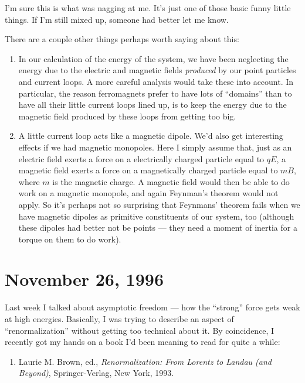 \documentclass{article}
\def\tightlist{}
\begin{document}
I'm sure this is what was nagging at me. It's just one of those basic
funny little things. If I'm still mixed up, someone had better let me
know.

There are a couple other things perhaps worth saying about this:

\begin{enumerate}
\def\labelenumi{\arabic{enumi}.}
\tightlist
\item
  In our calculation of the energy of the system, we have been
  neglecting the energy due to the electric and magnetic fields
  \emph{produced} by our point particles and current loops. A more
  careful analysis would take these into account. In particular, the
  reason ferromagnets prefer to have lots of ``domains'' than to have
  all their little current loops lined up, is to keep the energy due to
  the magnetic field produced by these loops from getting too big.
\item
  A little current loop acts like a magnetic dipole. We'd also get
  interesting effects if we had magnetic monopoles. Here I simply assume
  that, just as an electric field exerts a force on a electrically
  charged particle equal to \(q E\), a magnetic field exerts a force on
  a magnetically charged particle equal to \(m B\), where \(m\) is the
  magnetic charge. A magnetic field would then be able to do work on a
  magnetic monopole, and again Feynman's theorem would not apply. So
  it's perhaps not so surprising that Feynmans' theorem fails when we
  have magnetic dipoles as primitive constituents of our system, too
  (although these dipoles had better not be points --- they need a
  moment of inertia for a torque on them to do work).
\end{enumerate}
\hypertarget{week95}{%
\section{November 26, 1996}\label{week95}}

Last week I talked about asymptotic freedom --- how the ``strong'' force
gets weak at high energies. Basically, I was trying to describe an
aspect of ``renormalization'' without getting too technical about it. By
coincidence, I recently got my hands on a book I'd been meaning to read
for quite a while:

\begin{enumerate}
\def\labelenumi{\arabic{enumi})}
\tightlist
\item
  Laurie M. Brown, ed., \emph{Renormalization: From Lorentz to Landau
  (and Beyond)}, Springer-Verlag, New York, 1993.
\end{enumerate}
\end{document}
